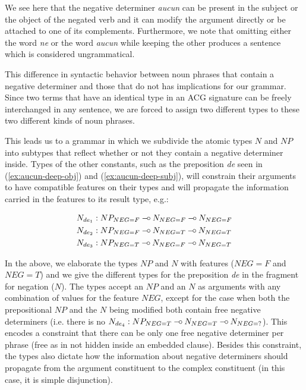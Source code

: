 \documentclass{llncs}
\def\limp {\mathbin{{-}\mkern-3.5mu{\circ}}}
\begin{document}
We see here that the negative determiner \emph{aucun} can be present in
the subject or the object of the negated verb and it can modify the
argument directly or be attached to one of its complements. Furthermore,
we note that omitting either the word \emph{ne} or the word \emph{aucun}
while keeping the other produces a sentence which is considered
ungrammatical.

This difference in syntactic behavior between noun phrases that contain a
negative determiner and those that do not has implications for our
grammar. Since two terms that have an identical type in an ACG signature can
be freely interchanged in any sentence, we are forced to assign two different
types to these two different kinds of noun phrases.


This leads us to a grammar in which we subdivide the atomic types $N$
and $NP$ into subtypes that reflect whether or not they contain a
negative determiner inside. Types of the other constants, such as the
preposition \emph{de} seen in (\ref{ex:aucun-deep-obj}) and
(\ref{ex:aucun-deep-subj}), will constrain their arguments to have
compatible features on their types and will propagate the information
carried in the features to its result type, e.g.:

\vspace{-4ex}

\begin{align*}
N_{de_1} &: NP_{NEG{=}F} \limp N_{NEG{=}F} \limp N_{NEG{=}F} \\
N_{de_2} &: NP_{NEG{=}F} \limp N_{NEG{=}T} \limp N_{NEG{=}T} \\
N_{de_3} &: NP_{NEG{=}T} \limp N_{NEG{=}F} \limp N_{NEG{=}T}
\end{align*}

\vspace{-1ex}

In the above, we elaborate the types $NP$ and $N$ with features ($NEG{=}F$
and $NEG{=}T$) and we give the different types for the preposition \emph{de}
in the fragment for negation ($N$). The types accept an $NP$ and an $N$ as
arguments with any combination of values for the feature $NEG$, except for the
case when both the prepositional $NP$ and the $N$ being modified both contain
free negative determiners (i.e. there is no $N_{de_4} : NP_{NEG{=}T} \limp
N_{NEG{=}T} \limp N_{NEG{=}?}$). This encodes a constraint that there can
be only one free negative determiner per phrase (free as in not hidden inside
an embedded clause). Besides this constraint, the types also dictate how the
information about negative determiners should propagate from the argument
constituent to the complex constituent (in this case, it is simple
disjunction).
\end{document}
